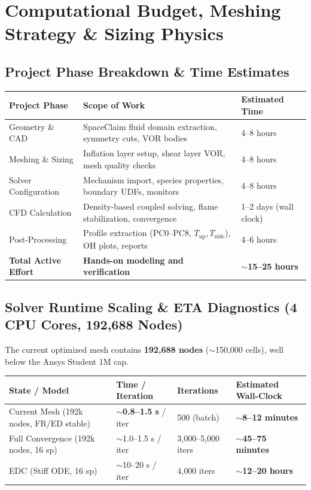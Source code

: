 \documentclass[11pt,a4paper]{article}
\begin{document}
\section{Computational Budget, Meshing Strategy \& Sizing Physics}

\subsection{Project Phase Breakdown \& Time Estimates}
\begin{table}[htbp]
\centering
\small
\begin{tabularx}{\textwidth}{L{3.5cm} Y L{2.8cm}}
\toprule
\textbf{Project Phase} & \textbf{Scope of Work} & \textbf{Estimated Time} \\
\midrule
Geometry \& CAD & SpaceClaim fluid domain extraction, symmetry cuts, VOR bodies & 4--8 hours \\
Meshing \& Sizing & Inflation layer setup, shear layer VOR, mesh quality checks & 4--8 hours \\
Solver Configuration & Mechanism import, species properties, boundary UDFs, monitors & 4--8 hours \\
CFD Calculation & Density-based coupled solving, flame stabilization, convergence & 1--2 days (wall clock) \\
Post-Processing & Profile extraction (PC0--PC8, $T_\text{up}, T_\text{side}$), OH plots, reports & 4--6 hours \\
\midrule
\textbf{Total Active Effort} & \textbf{Hands-on modeling and verification} & \textbf{$\sim$15--25 hours} \\
\bottomrule
\end{tabularx}
\end{table}

\subsection{Solver Runtime Scaling \& ETA Diagnostics (4 CPU Cores, 192,688 Nodes)}
The current optimized mesh contains \textbf{192,688 nodes} ($\sim$150,000 cells), well below the Ansys Student 1M cap. 

\begin{table}[htbp]
\centering
\small
\begin{tabularx}{\textwidth}{L{4.5cm} L{3.5cm} L{3.0cm} Y}
\toprule
\textbf{State / Model} & \textbf{Time / Iteration} & \textbf{Iterations} & \textbf{Estimated Wall-Clock} \\
\midrule
Current Mesh (192k nodes, FR/ED stable) & $\sim$\textbf{0.8--1.5 s} / iter & 500 (batch) & \textbf{$\sim$8--12 minutes} \\
Full Convergence (192k nodes, 16 sp) & $\sim$1.0--1.5 s / iter & 3,000--5,000 iters & \textbf{$\sim$45--75 minutes} \\
EDC (Stiff ODE, 16 sp) & $\sim$10--20 s / iter & 4,000 iters & \textbf{$\sim$12--20 hours} \\
\bottomrule
\end{tabularx}
\end{table}
\end{document}
